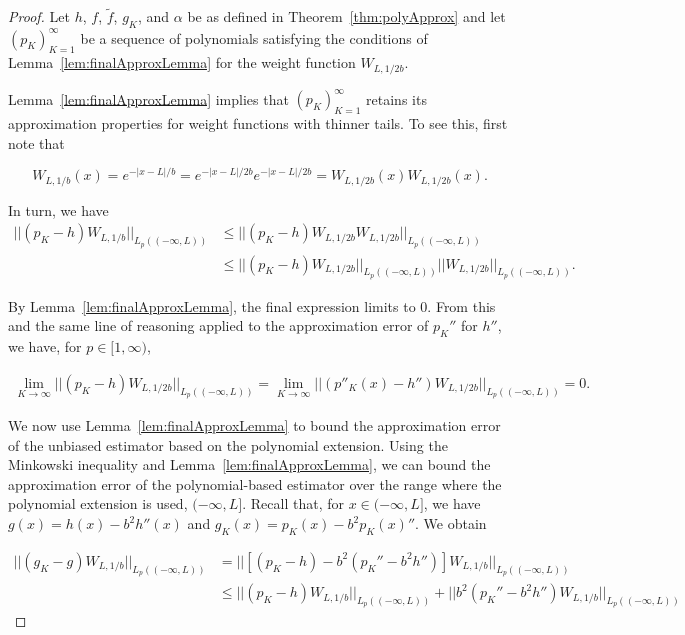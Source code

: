 \documentclass[11pt]{article}
\begin{document}
\begin{proof}
    
Let $h$, $f$, $\tilde{f}$, $g_K$, and $\alpha$ be as defined in Theorem~\ref{thm:polyApprox} and let $(p_K)_{K=1}^\infty$ be a sequence of polynomials satisfying the conditions of Lemma~\ref{lem:finalApproxLemma} for the weight function $W_{L,1/2b}$.

Lemma~\ref{lem:finalApproxLemma} implies that $(p_K)_{K=1}^\infty$ retains its approximation properties for weight functions with thinner tails. To see this, first note that

$$W_{L,1/b}(x) = e^{-|x-L|/b} 
= e^{-|x-L|/2b}e^{-|x-L|/2b} = W_{L,1/2b}(x)W_{L,1/2b}(x).$$ 

In turn, we have
\begin{align} 
    ||(p_K - h) W_{L,1/b}||_{L_p((-\infty,L))}
    &\leq ||(p_K - h) W_{L,1/2b}W_{L,1/2b}||_{L_p((-\infty,L))} \\
    &\leq ||(p_K - h) W_{L,1/2b}||_{L_p((-\infty,L))} ||W_{L,1/2b}||_{L_p((-\infty,L))}.
\end{align}

By Lemma~\ref{lem:finalApproxLemma}, the final expression limits to 0. From this and the same line of reasoning applied to the approximation error of $p_K''$ for $h''$, we have, for $p \in [1,\infty)$,

\begin{align} \label{eq:ApproxThinnerTailsH}
        \lim_{K \to \infty} ||(p_K - h) W_{L,1/2b}||_{L_p((-\infty,L))} = \lim_{K \to \infty}||(p''_K(x) -h'')W_{L,1/2b}||_{L_p((-\infty,L))} = 0.
\end{align}

We now use Lemma~\ref{lem:finalApproxLemma} to bound the approximation error of the unbiased estimator based on the polynomial extension. Using the Minkowski inequality and Lemma~\ref{lem:finalApproxLemma}, we can bound the approximation error of the polynomial-based estimator over the range where the polynomial extension is used, $(-\infty,L]$. Recall that, for $x \in (-\infty,L]$, we have $g(x) = h(x) - b^2h''(x)$ and $g_K(x) = p_K(x) - b^2 p_K(x)''$. We obtain

\begin{align}
    ||(g_K - g)W_{L,1/b}||_{L_p((-\infty,L))} &= 
    ||[(p_K - h) - b^2(p_K'' - b^2h'')]W_{L,1/b}||_{L_p((-\infty,L))} \\
    &\leq ||(p_K - h)W_{L,1/b}||_{L_p((-\infty,L))} + ||b^2(p_K'' - b^2h'')W_{L,1/b}||_{L_p((-\infty,L))}
\end{align}


\end{proof}
\end{document}
